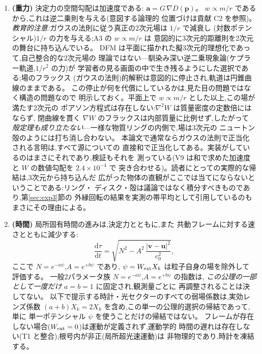 \documentclass[a4paper,10pt,twocolumn]{ltjsarticle}
\newcommand{\ud}{\mathrm{d}}
\newcommand{\vect}[1]{\bm{#1}}
\newcommand{\Kt}{X_k}
\begin{document}
\begin{enumerate}
\item[A6.]{\bf (重力)} 決定力の空間勾配は加速度である:
$\vect{a} = G\,\nabla D(\vect{p})$。
$w \propto m/r$ であるから,これは逆二乗則を与える(意図する論理的
位置づけは貢献 C2 を参照)。
\emph{教育的注意:}ガウスの法則に従う真正の2次元場は $1/r$ で減衰し
(対数ポテンシャル)$1/r$ の力を与える;A3 の $w \propto m/r$ は
意図的に3次元的距離則を2次元の舞台に持ち込んでいる。
DFM は平面に描かれた擬3次元的理想化であって,自己整合的な2次元場の
理論ではない---馴染み深い逆二乗現象論(ケプラー軌道,$1/r^2$ の力)が
学習者の見る画面の中で生き残るようにした選択である;場のフラックス
(ガウスの法則)的解釈は意図的に停止され,軌道は円錐曲線のままである。
この停止が何を代償にしているかは,見た目の問題ではなく構造の問題なので
明示しておく。平面上で $w \propto m/r$ とした以上,この場が満たす2次元の
ポアソン方程式は存在しない:$\nabla^2 W$ は質量密度の定数倍にはならず,
閉曲線を貫く $\nabla W$ のフラックスは内部質量に比例せず,したがって
\emph{殻定理も成り立たない}---一様な物質リングの内側で,場は3次元の
ニュートン殻のようには打ち消し合わない。
本論文で通常ならガウスの法則で正当化される言明は,すべて源についての
直接和で正当化してある。実装がしているのはまさにそれであり,検証もそれを
測っている(V9 は和で求めた加速度と $W$ の数値勾配を $2.4\times10^{-4}$ で
突き合わせる)。読者にとっての実際的な帰結は,3次元から持ち込んだ
広がった物体の直観がここでは当てにならないということである:リング・
ディスク・殻は議論ではなく積分すべきものであり,第\ref{sec:exp3}節の
外縁回転の結果を実測の帯平均として引用しているのもまさにその理由による。

\item[A7$'$.]{\bf (時間)} 局所固有時間の進みは,決定力とともに,また
共動フレームに対する速さとともに減少する:
\begin{equation}
\frac{\ud\tau}{\ud t}
 = \sqrt{N^2 - A^2\,\frac{|\vect{v}-\vect{u}|^2}{c_0^2}},
\label{eq:A7}
\end{equation}
ここで $N = e^{-a\psi}$,$A = e^{+b\psi}$ であり,
$\psi = W_{\rm ext}\Kt$ は粒子自身の場を除外して評価する。
一般2パラメータ族 $N = e^{-a\psi}$,$A = e^{+b\psi}$ の指数は,
\emph{この公理の一部として一度だけ} $a = b = 1$ に固定され,観測量ごとに
再調整されることは決してない。
以下で提示する時計・光セクターのすべての弱場係数は,実効レンズ係数
$(a+b)\Kt = 2\Kt$ を含め,この単一の公理的選択の帰結であって,単に
単一ポテンシャル $\psi$ を使うことだけの帰結ではない。
フレームが存在しない場合($W_{\rm ext}=0$)は運動が定義されず,運動学的
時間の遅れは存在しない(T1 と整合);根号内が非正(局所超光速運動)は
非物理的であり,時計を凍結する。


\end{enumerate}
\end{document}
